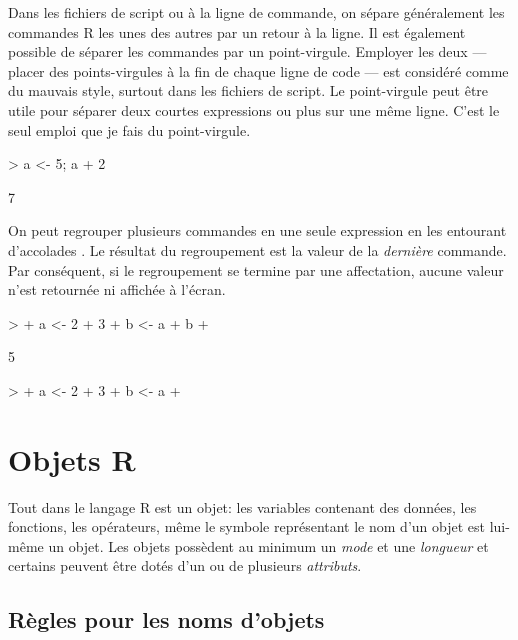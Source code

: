 Dans les fichiers de script ou à la ligne de commande, on sépare
généralement les commandes R les unes des autres par un retour à la
ligne. Il est également possible de séparer les commandes par un
point-virgule. Employer les deux --- placer des
points-virgules à la fin de chaque ligne de code --- est considéré
comme du mauvais style, surtout dans les fichiers de script. Le
point-virgule peut être utile pour séparer deux courtes expressions ou
plus sur une même ligne. C'est le seul emploi que je fais du
point-virgule.
\begin{Schunk}
\begin{Sinput}
> a <- 5; a + 2
\end{Sinput}
\begin{Soutput}
[1] 7
\end{Soutput}
\end{Schunk}

On peut regrouper plusieurs commandes en une seule expression en les
entourant d'accolades \Icode{\{~\}}. Le résultat du regroupement
est la valeur de la \emph{dernière} commande. Par conséquent, si le
regroupement se termine par une affectation, aucune valeur n'est
retournée ni affichée à l'écran.
\begin{Schunk}
\begin{Sinput}
> {
+     a <- 2 + 3
+     b <- a
+     b
+ }
\end{Sinput}
\begin{Soutput}
[1] 5
\end{Soutput}
\end{Schunk}
\begin{Schunk}
\begin{Sinput}
> {
+     a <- 2 + 3
+     b <- a
+ }
\end{Sinput}
\end{Schunk}


\section{Objets R}
\label{sec:premiers:objets}

Tout dans le langage R est un objet: les variables contenant des
données, les fonctions, les opérateurs, même le symbole représentant
le nom d'un objet est lui-même un objet. Les objets possèdent au
minimum un \emph{mode} et une \emph{longueur} et certains peuvent
être dotés d'un ou de plusieurs \emph{attributs}.

\subsection{Règles pour les noms d'objets}
\label{sec:premiers:objets:noms}

